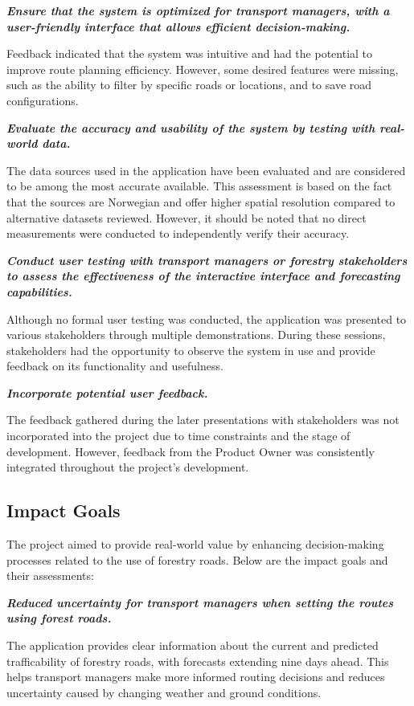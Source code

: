 \textbf{\textit{Ensure that the system is optimized for transport managers, with a user-friendly interface that allows efficient decision-making.}}

Feedback indicated that the system was intuitive and had the potential to improve route planning efficiency. However, some desired features were missing, such as the ability to filter by specific roads or locations, and to save road configurations.

\textbf{\textit{Evaluate the accuracy and usability of the system by testing with real-world data.}}

The data sources used in the application have been evaluated and are considered to be among the most accurate available. This assessment is based on the fact that the sources are Norwegian and offer higher spatial resolution compared to alternative datasets reviewed. However, it should be noted that no direct measurements were conducted to independently verify their accuracy.

\textbf{\textit{Conduct user testing with transport managers or forestry stakeholders to assess the effectiveness of the interactive interface and forecasting capabilities.}}

Although no formal user testing was conducted, the application was presented to various stakeholders through multiple demonstrations. During these sessions, stakeholders had the opportunity to observe the system in use and provide feedback on its functionality and usefulness.

\textbf{\textit{Incorporate potential user feedback.}}

The feedback gathered during the later presentations with stakeholders was not incorporated into the project due to time constraints and the stage of development. However, feedback from the Product Owner was consistently integrated throughout the project's development.


\subsection{Impact Goals}

The project aimed to provide real-world value by enhancing decision-making processes related to the use of forestry roads. Below are the impact goals and their assessments:

\textbf{\textit{Reduced uncertainty for transport managers when setting the routes using forest roads.}}

The application provides clear information about the current and predicted trafficability of forestry roads, with forecasts extending nine days ahead. This helps transport managers make more informed routing decisions and reduces uncertainty caused by changing weather and ground conditions.

